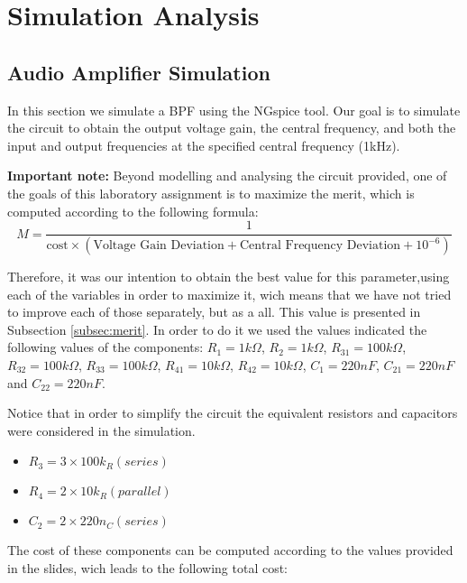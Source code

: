 \section{Simulation Analysis}
\label{sec:simulation}

\subsection{Audio Amplifier Simulation}
\label{subsec:amp_simulation}
\par In this section we simulate a BPF using the NGspice tool. Our goal is to simulate the circuit to obtain the output voltage gain, the central frequency, and both the input and output frequencies at the specified central frequency (1kHz).

\par  \textbf{Important note:} Beyond modelling and analysing the circuit provided, one of the goals of this laboratory assignment is to maximize the merit, which is computed according to the following formula:
\begin{equation}
  M = \frac{1}{\text{cost}\times(\text{Voltage Gain Deviation}+\text{Central Frequency Deviation}+10^{-6})}
\label{eq:merit}
\end{equation}

\par Therefore, it was our intention to obtain the best value for this parameter,using each of the variables in order to maximize it, wich means that we have not tried to improve each of those separately, but as a all. This value is presented in Subsection \ref{subsec:merit}.
In order to do it we used the values indicated the following values of the components: $R_{1}=1k\Omega$, $R_{2}=1k\Omega$, $R_{31}=100k\Omega$, $R_{32}=100k\Omega$, $R_{33}=100k\Omega$, $R_{41}=10k\Omega$, $R_{42}=10k\Omega$, $C_{1}=220nF$, $C_{21}=220nF$ and $C_{22}=220nF$. 

\par Notice that in order to simplify the circuit the equivalent resistors and capacitors were considered in the simulation.
\begin{itemize}
  \item $R_{3} = 3 \times 100k_{ R} (series)$
  \item $R_{4} = 2 \times 10k_{ R} (parallel)$
  \item $C_{2} = 2 \times 220n_{ C} (series)$
\end{itemize}

The cost of these components can be computed according to the values provided in the slides, wich leads to the following total cost:

